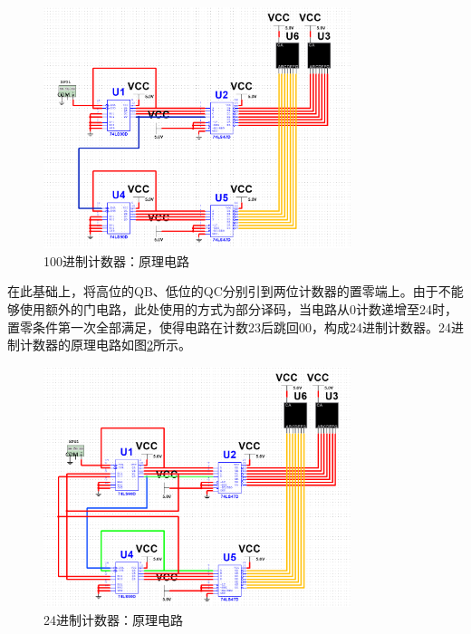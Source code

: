 \documentclass[UTF8]{ctexart}
\numberwithin{figure}{subsection}
\numberwithin{table}{subsection}
\numberwithin{equation}{subsection}
\begin{document}
\begin{figure}[H]
    \begin{center}
        \includegraphics[width=0.8\textwidth]{design/100 circuit.png}
    \end{center}
    \caption{100进制计数器：原理电路}
    \label{100 theory cir}
\end{figure}

在此基础上，将高位的QB、低位的QC分别引到两位计数器的置零端上。由于不能够使用额外的门电路，此处使用的方式为部分译码，当电路从0计数递增至24时，置零条件第一次全部满足，使得电路在计数23后跳回00，构成24进制计数器。24进制计数器的原理电路如图\ref{24 theory cir}所示。

\begin{figure}[H]
    \begin{center}
        \includegraphics[width=0.8\textwidth]{design/24 circuit.png}
    \end{center}
    \caption{24进制计数器：原理电路}
    \label{24 theory cir}
\end{figure}
\end{document}
